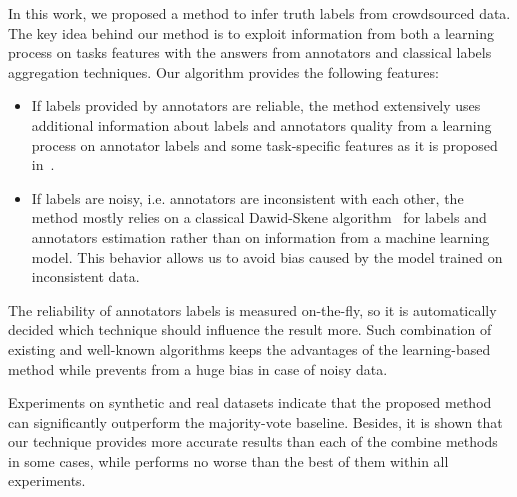 \label{raykar-ds-conclusion}

In this work, we proposed a method to infer truth labels from crowdsourced data. The key idea behind our method is to exploit information from both a learning process on tasks features with the answers from annotators and classical labels aggregation techniques. Our algorithm provides the following features:

\begin{itemize}
    \item If labels provided by annotators are reliable, the method extensively uses additional information about labels and annotators quality from a learning process on annotator labels and some task-specific features as it is proposed in~\cite{raykar2010learning}.
    \item If labels are noisy, i.e. annotators are inconsistent with each other, the method mostly relies on a classical Dawid-Skene algorithm~\cite{dawid1979maximum} for labels and annotators estimation rather than on information from a machine learning model. This behavior allows us to avoid bias caused by the model trained on inconsistent data.
\end{itemize}

The reliability of annotators labels is measured on-the-fly, so it is automatically decided which technique should influence the result more. Such combination of existing and well-known algorithms keeps the advantages of the learning-based method while prevents from a huge bias in case of noisy data.

Experiments on synthetic and real datasets indicate that the proposed method can significantly outperform the majority-vote baseline. Besides, it is shown that our technique provides more accurate results than each of the combine methods in some cases, while performs no worse than the best of them within all experiments. 

